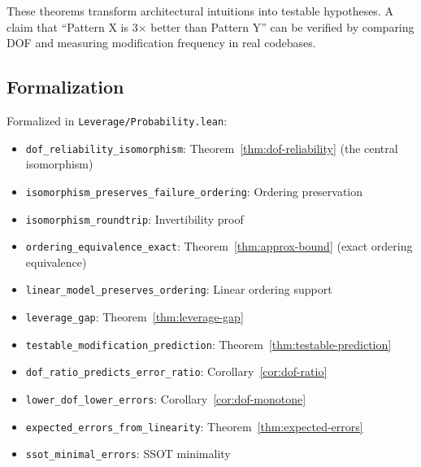 These theorems transform architectural intuitions into testable hypotheses. A claim that ``Pattern X is 3× better than Pattern Y'' can be verified by comparing DOF and measuring modification frequency in real codebases.

\subsection{Formalization}

Formalized in \texttt{Leverage/Probability.lean}:
\begin{itemize}
\item \texttt{dof\_reliability\_isomorphism}: Theorem~\ref{thm:dof-reliability} (the central isomorphism)
\item \texttt{isomorphism\_preserves\_failure\_ordering}: Ordering preservation
\item \texttt{isomorphism\_roundtrip}: Invertibility proof
\item \texttt{ordering\_equivalence\_exact}: Theorem~\ref{thm:approx-bound} (exact ordering equivalence)
\item \texttt{linear\_model\_preserves\_ordering}: Linear ordering support
\item \texttt{leverage\_gap}: Theorem~\ref{thm:leverage-gap}
\item \texttt{testable\_modification\_prediction}: Theorem~\ref{thm:testable-prediction}
\item \texttt{dof\_ratio\_predicts\_error\_ratio}: Corollary~\ref{cor:dof-ratio}
\item \texttt{lower\_dof\_lower\_errors}: Corollary~\ref{cor:dof-monotone}
\item \texttt{expected\_errors\_from\_linearity}: Theorem~\ref{thm:expected-errors}
\item \texttt{ssot\_minimal\_errors}: SSOT minimality
\end{itemize}
